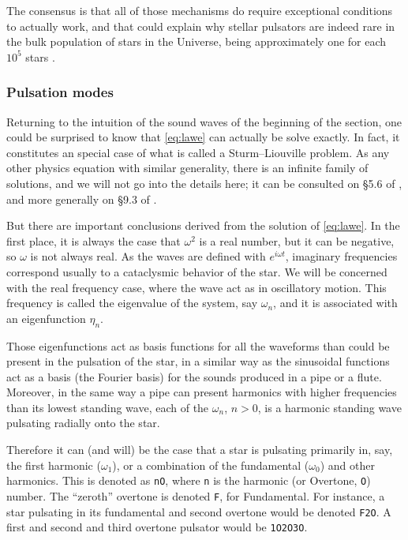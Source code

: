 	
	
	The consensus is that all of those mechanisms do require exceptional conditions to actually work, 
	and that could explain why stellar pulsators are indeed rare in the bulk population of stars in the Universe,
	being approximately one for each $10^5$ stars \citep{Carroll2017}.
	
	\subsubsection{Pulsation modes}
	
	
	Returning to the intuition of the sound waves of the beginning of the section,
	one could be surprised to know that \autoref{eq:lawe} can actually be solve exactly.
	In fact, it constitutes an special case of what is called a Sturm–Liouville problem.
	As any other physics equation with similar generality, there is an infinite family of solutions,
	and we will not go into the details here; it can be consulted on \S 5.6 of \cite{Catelan2015},
	and more generally on \S  9.3 of \cite{Butkov1968}.
	
	But there are important conclusions derived from the solution of \autoref{eq:lawe}.
	In the first place, it is always the case that $\omega^2$ is a real number, but it can be negative, so $\omega$ is not always real.
	As the waves are defined with $e^{i \omega t}$, imaginary frequencies correspond usually to a cataclysmic behavior of the star.
	We will be concerned with the real frequency case, where the wave act as in oscillatory motion.
	This frequency is called the eigenvalue of the system, say $\omega_n$, and it is associated with an eigenfunction $\eta_n$.
	
	Those eigenfunctions act as basis functions for all the waveforms than could be present in the pulsation of the star,
	in a similar way as the sinusoidal functions act as a basis (the Fourier basis) for the sounds produced in a pipe or a flute.
	Moreover, in the same way a pipe can present harmonics with higher frequencies than its lowest standing wave, 
	each of the $\omega_n$, $n>0$, is a harmonic standing wave pulsating radially onto the star.
	
	Therefore it can (and will) be the case that a star is pulsating primarily in, say, the first harmonic ($\omega_1$), 
	or a combination of the fundamental ($\omega_0$) and other harmonics.
	This is denoted as \texttt{nO}, where \texttt{n} is the harmonic (or Overtone, \texttt{O}) number. The \enquote{zeroth} overtone is denoted \texttt{F}, for Fundamental.
	For instance, a star pulsating in its fundamental and second overtone would be denoted \texttt{F2O}. A first and second and third overtone pulsator would be \texttt{1O2O3O}.
	
